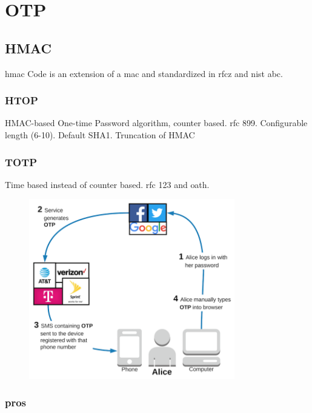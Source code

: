 \section{OTP}

\subsection{HMAC}

\gls{hmac} Code is an extension of a \gls{mac} and standardized in \gls{rfc}z and \gls{nist} abc.

\subsubsection{HTOP}

HMAC-based One-time Password algorithm, counter based. \gls{rfc} 899. Configurable length (6-10). Default SHA1. Truncation of HMAC

\subsubsection{TOTP}

Time based instead of counter based. \gls{rfc} 123 and \gls{oath}.


\begin{figure}[hbt]
  \centering
\includegraphics[width=0.8\textwidth]{pics/02---authentication-flow-3}
  \caption{}
\end{figure}

\subsubsection{pros}

